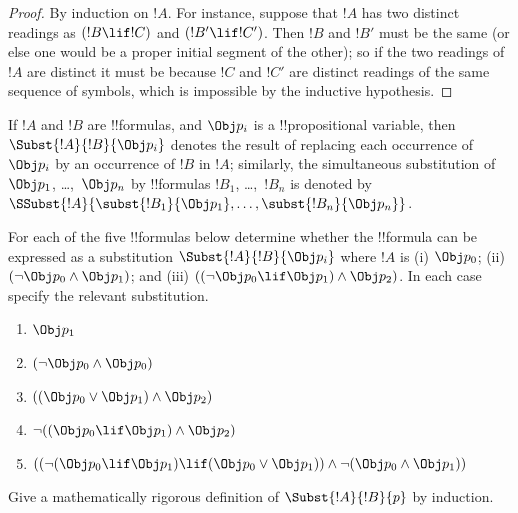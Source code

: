 \begin{proof}
By induction on $!A$. For instance, suppose that $!A$ has two distinct
readings as $(!B \lif !C)$ and $(!B' \lif !C')$. Then $!B$ and $!B'$
must be the same (or else one would be a proper initial segment of the
other); so if the two readings of $!A$ are distinct it must be because
$!C$ and $!C'$ are distinct readings of the same sequence of symbols,
which is impossible by the inductive hypothesis.
\end{proof}


\begin{defn}
If $!A$ and $!B$ are !!{formula}s, and $\Obj p_i$ is a !!{propositional
variable}, then $\Subst{!A}{!B}{\Obj p_i}$ denotes the result of
replacing each occurrence of $\Obj p_i$ by an occurrence of $!B$ in $!A$;
similarly, the simultaneous substitution of $\Obj p_1$, \dots,~$\Obj p_n$ by
!!{formula}s $!B_1$, \dots,~$!B_n$ is denoted by
$\SSubst{!A}{\subst{!B_1}{\Obj p_1},\dots,\subst{!B_n}{\Obj p_n}}$.
\end{defn}

\begin{prob} For each of the five !!{formula}s below determine whether the 
 !!{formula} can be expressed as a substitution \( \Subst{!A}{!B}{\Obj p_i} \)
 where \( !A \) is (i) \( \Obj p_0 \); (ii) \( ( \lnot \Obj p_0 \land \Obj
 p_1) \); and (iii) \( ( ( \lnot \Obj p_0 \lif \Obj p_1 ) \land \Obj
 p_2 ) \). In each case specify the relevant substitution.
  \begin{enumerate}
    \item \( \Obj p_1 \) 
    \item \( ( \lnot \Obj p_0 \land \Obj p_0 ) \)
    \item \( ( ( \Obj p_0 \lor \Obj p_1 ) \land \Obj p_2 )  \)
    \item \( \lnot ( ( \Obj p_0 \lif \Obj p_1 ) \land \Obj p_2 ) \)
    \item \( (( \lnot ( \Obj p_0 \lif \Obj p_1 ) \lif ( \Obj p_0 \lor \Obj p_1 )) \land \lnot ( \Obj p_0 \land \Obj p_1 )) \)
  \end{enumerate}
\end{prob}

\begin{prob}
Give a mathematically rigorous definition of $\Subst{!A}{!B}{p}$ by
induction.
\end{prob}






